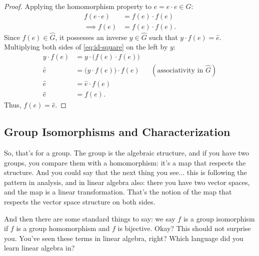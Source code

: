 \begin{content}

\begin{proof}
Applying the homomorphism property to $e = e \cdot e \in G$:
\begin{align}
f(e \cdot e) &= f(e) \cdot f(e) \nonumber \\
\implies f(e) &= f(e) \cdot f(e). \label{eq:id-square}
\end{align}
Since $f(e) \in \hat{G}$, it possesses an inverse $y \in \hat{G}$ such that $y \cdot f(e) = \hat{e}$. Multiplying both sides of \eqref{eq:id-square} on the left by $y$:
\begin{align*}
y \cdot f(e) &= y \cdot \bigl(f(e) \cdot f(e)\bigr) \\
\hat{e} &= \bigl(y \cdot f(e)\bigr) \cdot f(e) && (\text{associativity in } \hat{G}) \\
\hat{e} &= \hat{e} \cdot f(e) \\
\hat{e} &= f(e).
\end{align*}
Thus, $f(e) = \hat{e}$.
\end{proof}
\end{content}

\subsection{Group Isomorphisms and Characterization}

\begin{speech}[00:10:40 - 00:11:45]
So, that's for a group. The group is the algebraic structure, and if you have two groups, you compare them with a homomorphism: it's a map that respects the structure. And you could say that the next thing you see... this is following the pattern in analysis, and in linear algebra also: there you have two vector spaces, and the map is a linear transformation. That's the notion of the map that respects the vector space structure on both sides.

And then there are some standard things to say: we say $f$ is a group isomorphism  if $f$ is a group homomorphism  and $f$ is bijective.  Okay? This should not surprise you. You've seen these terms in linear algebra, right? Which language did you learn linear algebra in?
\end{speech}

